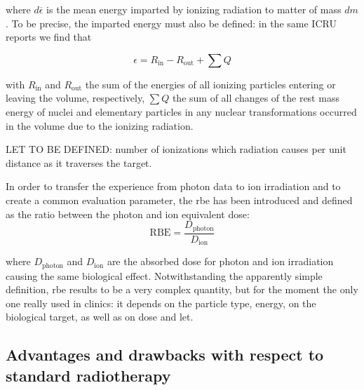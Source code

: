 where $d\overline{\epsilon}$ is the mean energy imparted by ionizing radiation to matter of mass $dm$. To be precise, the imparted energy must also be defined: in the same ICRU reports we find that 


\begin{equation}
\epsilon = R_{\mathrm{in}} - R_{\mathrm{out}} + \sum{Q}
\label{chap1::eq::impEnergyDef}
\end{equation}

with $R_{\mathrm{in}}$ and $R_{\mathrm{out}}$ the sum of the energies of all ionizing particles entering or leaving the volume, respectively, $ \sum{Q}$ the sum of all changes of the rest mass energy of nuclei and elementary particles in any nuclear transformations occurred in the volume due to the ionizing radiation.

LET TO BE DEFINED: number of ionizations which radiation causes per unit distance as it traverses the target.

In order to transfer the experience from photon data to ion irradiation and to create a common evaluation parameter, the \gls{rbe} has been introduced and defined as the ratio between the photon and ion equivalent dose:\\

\begin{equation}
\mathrm{RBE} = \frac{D_{\mathrm{photon}}}{D_{\mathrm{ion}}}
\label{chap1::eq::rbeDef}
\end{equation}

where $D_{\mathrm{photon}}$ and $D_{\mathrm{ion}}$ are the absorbed dose for photon and ion irradiation causing the same biological effect. Notwithstanding the apparently simple definition, \gls{rbe} results to be a very complex quantity, but for the moment the only one really used in clinics: it depends on the particle type, energy, on the biological target, as well as on dose and \gls{let}.

\subsection{Advantages and drawbacks with respect to standard radiotherapy}\label{chap1::subsec::ProContro}

